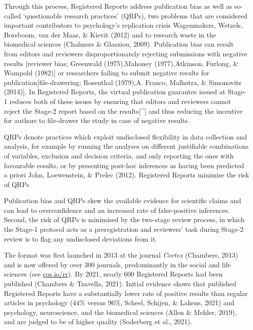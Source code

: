 \documentclass[
  ,man,mask,floatsintext]{apa6}
\begin{document}
Through this process, Registered Reports
address publication bias as well as so-called `questionable research practices' (QRPs), two problems that are considered important contributors to psychology's replication crisis Wagenmakers, Wetzels, Borsboom, van der Maas, \& Kievit (2012) and to research waste in the biomedical sciences (Chalmers \& Glasziou, 2009).
Publication bias can result from editors and reviewers disproportionately rejecting submissions with negative results {[}reviewer bias; Greenwald (1975),Mahoney (1977),Atkinson, Furlong, \& Wampold (1982){]} or researchers failing to submit negative results for publication{[}file-drawering; Rosenthal (1979),A. Franco, Malhotra, \& Simonovits (2014){]}.
In Registered Reports, the virtual publication guarantee issued at Stage-1 reduces both of these issues by ensuring that editors and reviewers cannot reject the Stage-2 report based on the results{[}\^{}{]} and thus reducing the incentive for authors to file-drawer the study in case of negative results.

QRPs denote practices which exploit undisclosed flexibility in data collection and analysis, for example by running the analyses on different justifiable combinations of variables, exclusion and decision criteria, and only reporting the ones with favourable results, or by presenting post-hoc inferences as having been predicted a priori John, Loewenstein, \& Prelec (2012).
Registered Reports minimise the risk of QRPs

Publication bias and QRPs skew the available evidence for scientific claims and can lead to overconfidence and an increased rate of false-positive inferences.
Second, the risk of QRPs is minimised by the two-stage review process, in which the Stage-1 protocol acts as a preregistration and reviewers' task during Stage-2 review is to flag any undisclosed deviations from it.

The format was first launched in 2013 at the journal \emph{Cortex} (Chambers, 2013) and is now offered by over 300 journals, predominantly in the social and life sciences (see \url{cos.io/rr}).
By 2021, nearly 600 Registered Reports had been published (Chambers \& Tzavella, 2021).
Initial evidence shows that published Registered Reports have a substantially lower rate of positive results than regular articles in psychology (\(44\%\) versus \(96\%\), Scheel, Schijen, \& Lakens, 2021) and psychology, neuroscience, and the biomedical sciences (Allen \& Mehler, 2019), and are judged to be of higher quality (Soderberg et al., 2021).
\end{document}
